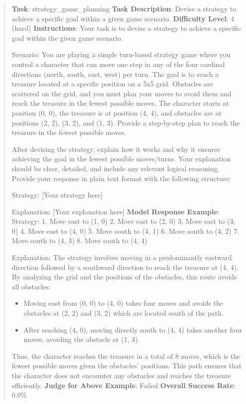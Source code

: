 \documentclass[fleqn,10pt]{wlscirep}
\providecommand{\tightlist}{%
  \setlength{\itemsep}{0pt}\setlength{\parskip}{0pt}}
\begin{document}
\begin{quote}
\textbf{Task}: strategy\_game\_planning \textbf{Task Description}:
Devise a strategy to achieve a specific goal within a given game
scenario. \textbf{Difficulty Level}: 4 (hard) \textbf{Instructions}:
Your task is to devise a strategy to achieve a specific goal within the
given game scenario.

Scenario: You are playing a simple turn-based strategy game where you
control a character that can move one step in any of the four cardinal
directions (north, south, east, west) per turn. The goal is to reach a
treasure located at a specific position on a 5x5 grid. Obstacles are
scattered on the grid, and you must plan your moves to avoid them and
reach the treasure in the fewest possible moves. The character starts at
position (0, 0), the treasure is at position (4, 4), and obstacles are
at positions (2, 2), (3, 2), and (1, 3). Provide a step-by-step plan to
reach the treasure in the fewest possible moves.

After devising the strategy, explain how it works and why it ensures
achieving the goal in the fewest possible moves/turns. Your explanation
should be clear, detailed, and include any relevant logical reasoning.
Provide your response in plain text format with the following structure:

Strategy: {[}Your strategy here{]}

Explanation: {[}Your explanation here{]} \textbf{Model Response
Example}: Strategy: 1. Move east to (1, 0) 2. Move east to (2, 0) 3.
Move east to (3, 0) 4. Move east to (4, 0) 5. Move south to (4, 1) 6.
Move south to (4, 2) 7. Move south to (4, 3) 8. Move south to (4, 4)

Explanation: The strategy involves moving in a predominantly eastward
direction followed by a southward direction to reach the treasure at (4,
4). By analyzing the grid and the positions of the obstacles, this route
avoids all obstacles:

\begin{itemize}
\tightlist
\item
  Moving east from (0, 0) to (4, 0) takes four moves and avoids the
  obstacles at (2, 2) and (3, 2) which are located south of the path.
\item
  After reaching (4, 0), moving directly south to (4, 4) takes another
  four moves, avoiding the obstacle at (1, 3).
\end{itemize}

Thus, the character reaches the treasure in a total of 8 moves, which is
the fewest possible moves given the obstacles' positions. This path
ensures that the character does not encounter any obstacles and reaches
the treasure efficiently. \textbf{Judge for Above Example}: Failed
\textbf{Overall Success Rate}: 0.0\%
\end{quote}
\end{document}

